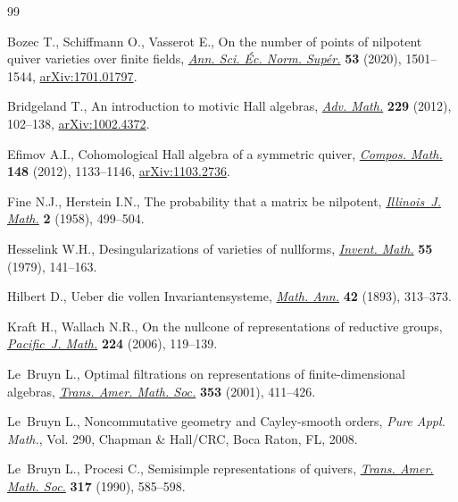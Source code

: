 \documentclass[10pt,a4paper]{amsart}
\numberwithin{equation}{section}
\theoremstyle{definition}
\begin{document}
\begin{thebibliography}{99}
\footnotesize\itemsep=0pt

Bozec T., Schiffmann O., Vasserot E., On the number of points of nilpotent
 quiver varieties over finite fields,
 \href{https://doi.org/10.24033/asens.2452}{\textit{Ann. Sci. \'Ec. Norm.
 Sup\'er.}} \textbf{53} (2020), 1501--1544,
 \href{http://arxiv.org/abs/1701.01797}{arXiv:1701.01797}.

Bridgeland T., An introduction to motivic {H}all algebras,
 \href{https://doi.org/10.1016/j.aim.2011.09.003}{\textit{Adv. Math.}}
 \textbf{229} (2012), 102--138,
 \href{http://arxiv.org/abs/1002.4372}{arXiv:1002.4372}.

Efimov A.I., Cohomological {H}all algebra of a symmetric quiver,
 \href{https://doi.org/10.1112/S0010437X12000152}{\textit{Compos. Math.}}
 \textbf{148} (2012), 1133--1146,
 \href{http://arxiv.org/abs/1103.2736}{arXiv:1103.2736}.

Fine N.J., Herstein I.N., The probability that a matrix be nilpotent,
 \href{https://doi.org/10.1215/ijm/1255454112}{\textit{Illinois~J. Math.}}
 \textbf{2} (1958), 499--504.

Hesselink W.H., Desingularizations of varieties of nullforms,
 \href{https://doi.org/10.1007/BF01390087}{\textit{Invent. Math.}} \textbf{55}
 (1979), 141--163.

Hilbert D., Ueber die vollen {I}nvariantensysteme,
 \href{https://doi.org/10.1007/BF01444162}{\textit{Math. Ann.}} \textbf{42}
 (1893), 313--373.

Kraft H., Wallach N.R., On the nullcone of representations of reductive groups,
 \href{https://doi.org/10.2140/pjm.2006.224.119}{\textit{Pacific~J. Math.}}
 \textbf{224} (2006), 119--139.

Le~Bruyn L., Optimal filtrations on representations of finite-dimensional
 algebras, \href{https://doi.org/10.1090/S0002-9947-00-02590-3}{\textit{Trans.
 Amer. Math. Soc.}} \textbf{353} (2001), 411--426.

Le~Bruyn L., Noncommutative geometry and {C}ayley-smooth orders, \textit{Pure
 Appl. Math.}, Vol. 290, Chapman \& Hall/CRC, Boca Raton, FL, 2008.

Le~Bruyn L., Procesi C., Semisimple representations of quivers,
 \href{https://doi.org/10.2307/2001477}{\textit{Trans. Amer. Math. Soc.}}
 \textbf{317} (1990), 585--598.


\end{thebibliography}
\end{document}
